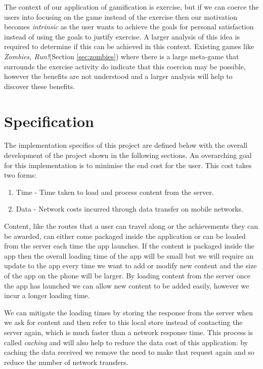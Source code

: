 The context of our application of gamification is exercise, but if we
can coerce the users into focusing on the game instead of the exercise
then our motivation becomes \emph{intrinsic} as the user wants to
achieve the goals for personal satisfaction instead of using the goals
to justify exercise. A larger analysis of this idea is required to
determine if this can be achieved in this context. Existing games like
\emph{Zombies, Run!}(Section \ref{sec:zombies}) where there is a large
meta-game that surrounds the exercise activity do indicate that this
coercion may be possible, however the benefits are not understood and
a larger analysis will help to discover these benefits. 

\section{Specification}
\label{sec:specification}
The implementation specifics of this project are defined below with
the overall development of the project shown in the following sections.
An overarching goal for this implementation is to minimise the end cost
for the user. This cost takes two forms: 
\begin{enumerate}
\item Time - Time taken to load and process content from the server.
\item Data - Network costs incurred through data transfer on mobile networks.
\end{enumerate}

Content, like the routes that a user can travel along or the
achievements they can be awarded, can either come packaged inside the
application or can be loaded from the server each time the app
launches. If the content is packaged inside the app then the overall
loading time of the app will be small but we will require an update to
the app every time we want to add or modify new content and the size
of the app on the phone will be larger. By loading content from the
server once the app has launched we can allow new content to be added
easily, however we incur a longer loading time.

We can mitigate the loading times by storing the response from the
server when we ask for content and then refer to this local store
instead of contacting the server again, which is much faster than a
network response time. This process is called \emph{caching} and will
also help to reduce the data cost of this application: by caching the
data received we remove the need to make that request again and so
reduce the number of network transfers.

